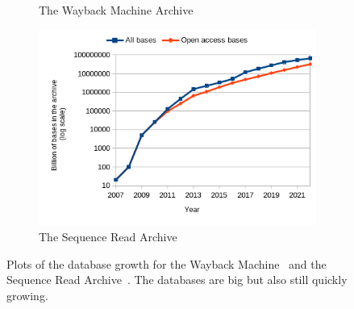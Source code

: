 \begin{figure}
    \centering
    \begin{subfigure}[b]{0.45\textwidth}
        \caption{The Wayback Machine Archive}
    \end{subfigure}
    \begin{subfigure}[b]{0.49\textwidth}
    \includegraphics[width=\textwidth]{0_sheets/sra_growth.png}
    \caption{The Sequence Read Archive}
\end{subfigure}
\caption{Plots of the database growth for the Wayback Machine~\cite{web-archive-growth} and the Sequence Read Archive~\cite{sra}. The databases are big but also still quickly growing.}
\label{fig:scalability}
\end{figure}

